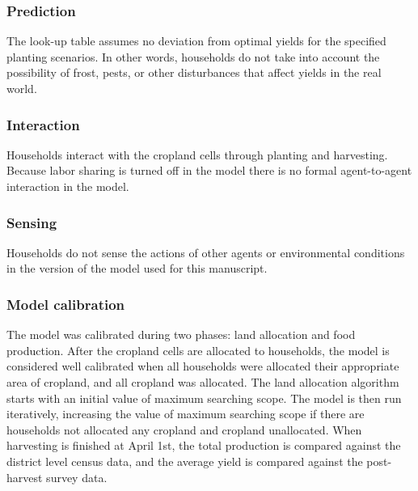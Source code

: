 \documentclass[11pt, titlepage]{article}
\begin{document}
\subsubsection{Prediction} 
The look-up table assumes no deviation from optimal yields for the specified planting scenarios. In other words, households do not take into account the possibility of frost, pests, or other disturbances that affect yields in the real world.

\subsubsection{Interaction} 
Households interact with the cropland cells through planting and harvesting. Because labor sharing is turned off in the model there is no formal agent-to-agent interaction in the model.

\subsubsection{Sensing} 
Households do not sense the actions of other agents or environmental conditions in the version of the model used for this manuscript. 


\subsubsection{Model calibration} 
The model was calibrated during two phases: land allocation and food production. After the cropland cells are allocated to households, the model is considered well calibrated when all households were allocated their appropriate area of cropland, and all cropland was allocated. The land allocation algorithm starts with an initial value of maximum searching scope. The model is then run iteratively, increasing the value of maximum searching scope if there are households not allocated any cropland and cropland unallocated. When harvesting is finished at April 1st, the total production is compared against the district level census data, and the average yield is compared against the post-harvest survey data.

\FloatBarrier
 
{\footnotesize }
\end{document}
